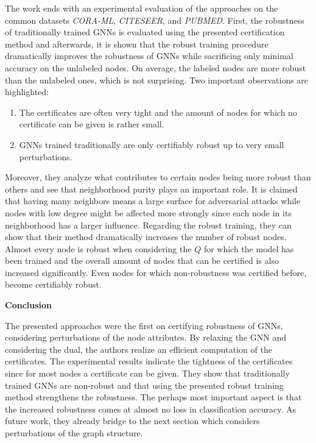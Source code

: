 \documentclass[a4paper,preprint]{sig-alternate}
\begin{document}
The work ends with an experimental evaluation of the approaches on the common datasets \textit{CORA-ML}, 
\textit{CITESEER}, and \textit{PUBMED}. First, the robustness of traditionally trained GNNs is evaluated using the presented
certification method and afterwards, it is shown that the robust training procedure dramatically improves the robustness 
of GNNs while sacrificing only minimal accuracy on the unlabeled nodes. On average, the labeled nodes are more robust than the unlabeled
ones, which is not surprising. Two important observations are highlighted:
\begin{enumerate}
    \item The certificates are often very tight and the amount of nodes for which no certificate can be given is rather small.
    \item GNNs trained traditionally are only certifiably robust up to very small perturbations.
\end{enumerate}
Moreover, they analyze what contributes to certain nodes being more robust than others and see that neighborhood purity plays an important role.
It is claimed that having many neighbors means a large surface for adversarial attacks while nodes with low degree might be affected more strongly 
since each node in its neighborhood has a larger influence.\newline
Regarding the robust training, they can show that their method dramatically increases the number of robust nodes. Almost every node
is robust when considering the $Q$ for which the model has been trained and the overall amount of nodes that can be certified is also 
increased significantly. Even nodes for which non-robustness was certified before, become certifiably robust.\newline

\textbf{Conclusion}\newline

The presented approaches were the first on certifying robustness of GNNs, considering perturbations of the node attributes.
By relaxing the GNN and considering the dual, the authors realize an efficient computation of the certificates.
The experimental results indicate the tightness of the certificates since for most nodes a certificate can be given.
They show that traditionally trained GNNs are non-robust and that using the presented robust training method strengthens the robustness.
The perhaps most important aspect is that the increased robustness comes at almost no loss in classification accuracy.
As future work, they already bridge to the next section which considers perturbations of the graph structure.
\end{document}
